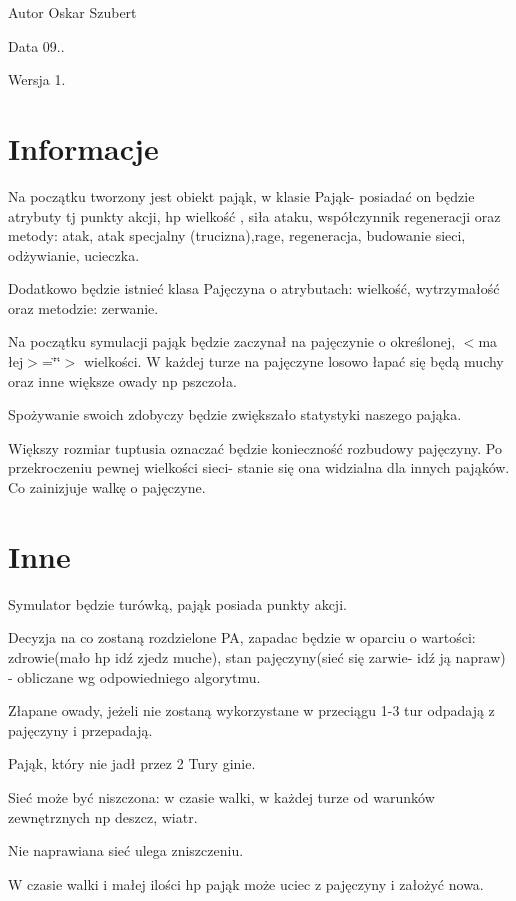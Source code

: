 \begin{DoxyAuthor}{Autor}
Oskar Szubert 
\end{DoxyAuthor}
\begin{DoxyDate}{Data}
09.. 
\end{DoxyDate}
\begin{DoxyVersion}{Wersja}
1.
\end{DoxyVersion}
\hypertarget{index_Informacje}{}\section{Informacje}\label{index_Informacje}

\begin{DoxyItemize}
\item Na początku tworzony jest obiekt pająk, w klasie Pająk-\/ posiadać on będzie atrybuty tj punkty akcji, hp wielkość , siła ataku, współczynnik regeneracji oraz metody\+: atak, atak specjalny (trucizna),rage, regeneracja, budowanie sieci, odżywianie, ucieczka.
\item Dodatkowo będzie istnieć klasa Pajęczyna o atrybutach\+: wielkość, wytrzymałość oraz metodzie\+: zerwanie.
\item Na początku symulacji pająk będzie zaczynał na pajęczynie o określonej, $<$ma łej$>$=\char`\"{}\char`\"{}$>$ wielkości. W każdej turze na pajęczyne losowo łapać się będą muchy oraz inne większe owady np pszczoła.
\item Spożywanie swoich zdobyczy będzie zwiększało statystyki naszego pająka.
\item Większy rozmiar tuptusia oznaczać będzie konieczność rozbudowy pajęczyny. Po przekroczeniu pewnej wielkości sieci-\/ stanie się ona widzialna dla innych pająków. Co zainizjuje walkę o pajęczyne.
\end{DoxyItemize}\hypertarget{index_Inne}{}\section{Inne}\label{index_Inne}

\begin{DoxyItemize}
\item Symulator będzie turówką, pająk posiada punkty akcji.
\item Decyzja na co zostaną rozdzielone PA, zapadac będzie w oparciu o wartości\+: zdrowie(mało hp idź zjedz muche), stan pajęczyny(sieć się zarwie-\/ idź ją napraw) -\/ obliczane wg odpowiedniego algorytmu.
\item Złapane owady, jeżeli nie zostaną wykorzystane w przeciągu 1-\/3 tur odpadają z pajęczyny i przepadają.
\item Pająk, który nie jadł przez 2 Tury ginie.
\item Sieć może być niszczona\+: w czasie walki, w każdej turze od warunków zewnętrznych np deszcz, wiatr.
\item Nie naprawiana sieć ulega zniszczeniu.
\item W czasie walki i małej ilości hp pająk może uciec z pajęczyny i założyć nowa. 
\end{DoxyItemize}